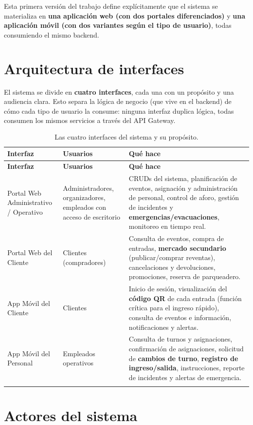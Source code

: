 \documentclass[12pt,a4paper]{article}
\begin{document}
Esta primera versión del trabajo define explícitamente que el sistema se materializa en
\textbf{una aplicación web (con dos portales diferenciados)} y \textbf{una aplicación móvil (con
dos variantes según el tipo de usuario)}, todas consumiendo el mismo backend.

\section{Arquitectura de interfaces}

El sistema se divide en \textbf{cuatro interfaces}, cada una con un propósito y una audiencia
clara. Esto separa la lógica de negocio (que vive en el backend) de cómo cada tipo de usuario la
consume: ninguna interfaz duplica lógica, todas consumen los mismos servicios a través del API
Gateway.

\begin{longtable}{p{3.3cm}p{3.2cm}p{7.5cm}}
\toprule
\textbf{Interfaz} & \textbf{Usuarios} & \textbf{Qué hace}\\
\midrule
\endfirsthead
\toprule
\textbf{Interfaz} & \textbf{Usuarios} & \textbf{Qué hace}\\
\midrule
\endhead
Portal Web Administrativo / Operativo &
Administradores, organizadores, empleados con acceso de escritorio &
CRUDs del sistema, planificación de eventos, asignación y administración de personal, control de
aforo, gestión de incidentes y \textbf{emergencias/evacuaciones}, monitoreo en tiempo real.\\[0.4em]
Portal Web del Cliente &
Clientes (compradores) &
Consulta de eventos, compra de entradas, \textbf{mercado secundario} (publicar/comprar
reventas), cancelaciones y devoluciones, promociones, reserva de parqueadero.\\[0.4em]
App Móvil del Cliente &
Clientes &
Inicio de sesión, visualización del \textbf{código QR} de cada entrada (función crítica para el
ingreso rápido), consulta de eventos e información, notificaciones y alertas.\\[0.4em]
App Móvil del Personal &
Empleados operativos &
Consulta de turnos y asignaciones, confirmación de asignaciones, solicitud de \textbf{cambios de
turno}, \textbf{registro de ingreso/salida}, instrucciones, reporte de incidentes y alertas de
emergencia.\\
\bottomrule
\caption{Las cuatro interfaces del sistema y su propósito.}
\end{longtable}

\section{Actores del sistema}
\end{document}
